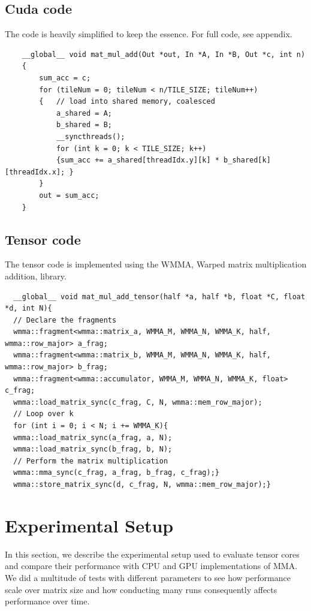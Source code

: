 \documentclass[conference]{IEEEtran}
\begin{document}
  \subsection{Cuda code}\label{sec:CudaCode}
  The code is heavily simplified to keep the essence. For full code, see appendix.

  \begin{lstlisting}
    __global__ void mat_mul_add(Out *out, In *A, In *B, Out *c, int n)
    {   
        sum_acc = c;
        for (tileNum = 0; tileNum < n/TILE_SIZE; tileNum++)
        {   // load into shared memory, coalesced
            a_shared = A;
            b_shared = B;
            __syncthreads();
            for (int k = 0; k < TILE_SIZE; k++)
            {sum_acc += a_shared[threadIdx.y][k] * b_shared[k][threadIdx.x]; }
        }
        out = sum_acc;
    }   
  \end{lstlisting}
  
  
  \subsection{Tensor code}\label{sec:TensorCode}
  The tensor code is implemented using the WMMA,  Warped matrix multiplication addition,
  library.
  \begin{lstlisting}
  __global__ void mat_mul_add_tensor(half *a, half *b, float *C, float *d, int N){
  // Declare the fragments
  wmma::fragment<wmma::matrix_a, WMMA_M, WMMA_N, WMMA_K, half, wmma::row_major> a_frag;
  wmma::fragment<wmma::matrix_b, WMMA_M, WMMA_N, WMMA_K, half, wmma::row_major> b_frag;
  wmma::fragment<wmma::accumulator, WMMA_M, WMMA_N, WMMA_K, float> c_frag;
  wmma::load_matrix_sync(c_frag, C, N, wmma::mem_row_major);
  // Loop over k
  for (int i = 0; i < N; i += WMMA_K){
  wmma::load_matrix_sync(a_frag, a, N);
  wmma::load_matrix_sync(b_frag, b, N);
  // Perform the matrix multiplication
  wmma::mma_sync(c_frag, a_frag, b_frag, c_frag);}
  wmma::store_matrix_sync(d, c_frag, N, wmma::mem_row_major);}
  \end{lstlisting}

  \section{Experimental Setup}\label{sec:experimental-setup}
  
  In this section, we describe the experimental setup used to evaluate 
  tensor cores and compare their performance with CPU and GPU implementations of MMA.
  We did a multitude of tests with different parameters to see how performance scale over matrix size
  and how conducting many runs consequently affects performance over time.
\end{document}
